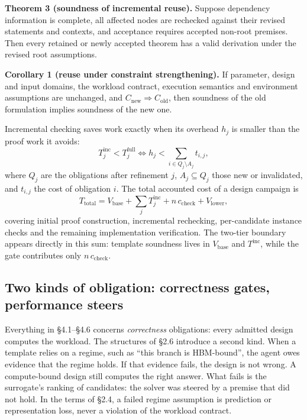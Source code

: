 \documentclass[11pt]{article}
\begin{document}
\textbf{Theorem 3 (soundness of incremental reuse).} Suppose dependency information is complete, all affected nodes are rechecked against their revised statements and contexts, and acceptance requires accepted non-root premises. Then every retained or newly accepted theorem has a valid derivation under the revised root assumptions.

\textbf{Corollary 1 (reuse under constraint strengthening).} If parameter, design and input domains, the workload contract, execution semantics and environment assumptions are unchanged, and \(C_{\mathrm{new}}\Rightarrow C_{\mathrm{old}}\), then soundness of the old formulation implies soundness of the new one.

Incremental checking saves work exactly when its overhead \(h_j\) is smaller than the proof work it avoids:
\[
T^{\mathrm{inc}}_j<T^{\mathrm{full}}_j\iff h_j<\sum_{i\in Q_j\setminus A_j}t_{i,j},
\]
where \(Q_j\) are the obligations after refinement \(j\), \(A_j\subseteq Q_j\) those new or invalidated, and \(t_{i,j}\) the cost of obligation \(i\). The total accounted cost of a design campaign is
\[
T_{\mathrm{total}}=V_{\mathrm{base}}+\sum_j T^{\mathrm{inc}}_j+n\,c_{\mathrm{check}}+V_{\mathrm{lower}},
\]
covering initial proof construction, incremental rechecking, per-candidate instance checks and the remaining implementation verification. The two-tier boundary appears directly in this sum: template soundness lives in \(V_{\mathrm{base}}\) and \(T^{\mathrm{inc}}\), while the gate contributes only \(n\,c_{\mathrm{check}}\).

\hypertarget{two-kinds-of-obligation-correctness-gates-performance-steers}{%
\subsection{Two kinds of obligation: correctness gates, performance steers}\label{two-kinds-of-obligation-correctness-gates-performance-steers}}

Everything in §4.1--§4.6 concerns \emph{correctness} obligations: every admitted design computes the workload. The structures of §2.6 introduce a second kind. When a template relies on a regime, such as ``this branch is HBM-bound'', the agent owes evidence that the regime holds. If that evidence fails, the design is not wrong. A compute-bound design still computes the right answer. What fails is the surrogate's ranking of candidates: the solver was steered by a premise that did not hold. In the terms of §2.4, a failed regime assumption is prediction or representation loss, never a violation of the workload contract.
\end{document}
